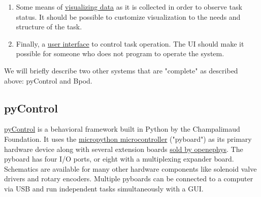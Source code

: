 \begin{enumerate}
\item Some means of \hyperref[sec:plotting]{visualizing data} as it is collected in order to  observe task status. It should be possible to customize visualization to the needs and structure of the task.
\item Finally, a \hyperref[sec:ui]{user interface} to control task operation. The UI should make it possible for someone who does not program to operate the system.
\end{enumerate}

We will briefly describe two other systems that are "complete" as described above: pyControl and Bpod.

\subsection{pyControl}

\href{https://pycontrol.readthedocs.io/en/latest/}{pyControl}\citep{akamOpensourcePythonbasedHardware2022} is a behavioral framework built in Python by the Champalimaud Foundation. It uses the \href{https://micropython.org/}{micropython microcontroller} ("pyboard") as its primary hardware device along with several extension boards \href{http://www.open-ephys.org/store/pycontrol}{sold by openephys}. The pyboard has four I/O ports, or eight with a multiplexing expander board. Schematics are available for many other hardware components like solenoid valve drivers and rotary encoders. Multiple pyboards can be connected to a computer via USB and run independent tasks simultaneously with a GUI.

